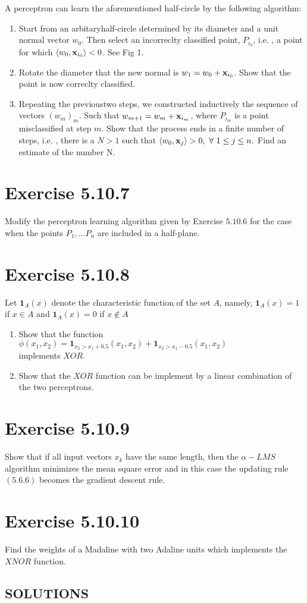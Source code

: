 \documentclass{exam}
\begin{document}
A perceptron can learn the aforementioned half-circle by the following algorithm:\\

\begin{enumerate}[label*=\arabic*.]
    \item Start from an arbitaryhalf-circle determined by its diameter and a unit normal vector $w_0$. Then select an incorreclty classified point, $P_{i_0}$, i.e.
    , a point for which $\left< w_0, \bold{x}_{i_0}\right> < 0$. See Fig 1. 
    \item Rotate the diameter that the new normal is $w_1 = w_0 + \bold{x}_{i_0}$. Show that the point is now correclty classified.
    \item Repeating the previoustwo steps, we constructed inductively the sequence of vectors $(w_m)_{m}$. Such that $w_{m+1} = w_m + \bold{x}_{i_m}$, where $P_{i_m}$ is 
    a point misclassified at step $m$. Show that the process ends in a finite number of steps, i.e. , there is a $N > 1$ such that $\left< w_0, \bold{x}_{j}\right> > 0, \  \forall \ 1 \leq j \leq n.$ 
    Find an estimate of the number N.
\end{enumerate}

\section*{Exercise 5.10.7}
Modify the perceptron learning algorithm given by Exercise $5.10.6$ for the case when the points $P_1, \ldots P_n$ are included in a half-plane.

\section*{Exercise 5.10.8}
Let $\boldsymbol{1}_{A}(x)$ denote the characteristic function of the set $A$, namely, $\boldsymbol{1}_{A}(x) = 1$ if $x \in A$ and $\boldsymbol{1}_{A}(x) = 0$ if $x \notin A$
\begin{enumerate}
    \item Show that the function
    $\phi(x_1,x_2) = \boldsymbol{1}_{x_2 > x_1 + 0.5}(x_1,x_2) + \boldsymbol{1}_{x_2 > x_1 - 0.5}(x_1,x_2)$ \\
    implements $XOR$.
    \item Show that the $XOR$ function can be implement by a linear combination of the two perceptrons.
\end{enumerate}

\section*{Exercise 5.10.9}
Show that if all input vectors $x_k$ have the same length, then the $\alpha-LMS$ algorithm minimizes the mean square error and in this case the updating 
rule $(5.6.6)$ becomes the gradient descent rule.
\section*{Exercise 5.10.10}
Find the weights of a Madaline with two Adaline units which implements the $XNOR$ function.
\begin{center}    
    \section*{SOLUTIONS}
\end{center}
\end{document}
